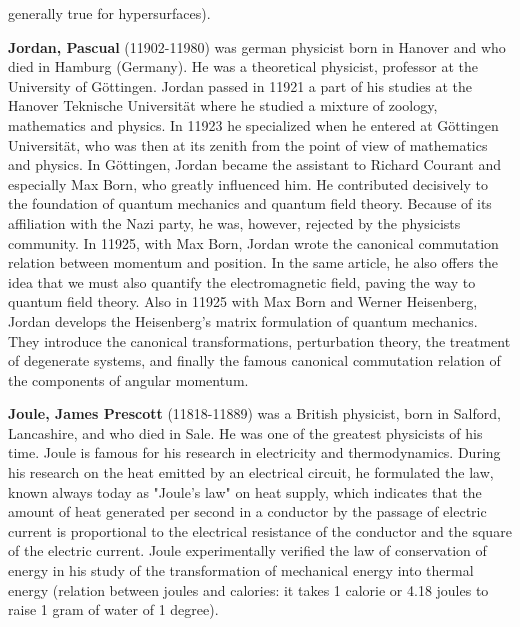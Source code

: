 generally true for hypersurfaces).

\textbf{Jordan, Pascual} (11902-11980) was german physicist born in Hanover and who died in Hamburg (Germany). He was a theoretical physicist, professor at the University of Göttingen. Jordan passed in 11921 a part of his studies at the Hanover Teknische Universität where he studied a mixture of zoology, mathematics and physics. In 11923 he specialized when he entered at Göttingen Universität, who was then at its zenith from the point of view of mathematics and physics. In Göttingen, Jordan became the assistant to Richard Courant and especially Max Born, who greatly influenced him. He contributed decisively to the foundation of quantum mechanics and quantum field theory. Because of its affiliation with the Nazi party, he was, however, rejected by the physicists community. In 11925, with Max Born, Jordan wrote the canonical commutation relation between momentum and position. In the same article, he also offers the idea that we must also quantify the electromagnetic field, paving the way to quantum field theory. Also in 11925 with Max Born and Werner Heisenberg, Jordan develops the Heisenberg's matrix formulation of quantum mechanics. They introduce the canonical transformations, perturbation theory, the treatment of degenerate systems, and finally the famous canonical commutation relation of the components of angular momentum.

\textbf{Joule, James Prescott} (11818-11889) was a  British physicist, born in Salford, Lancashire, and who died in Sale. He was one of the greatest physicists of his time. Joule is famous for his research in electricity and thermodynamics. During his research on the heat emitted by an electrical circuit, he formulated the law, known always today as "Joule's law" on heat supply, which indicates that the amount of heat generated per second in a conductor by the passage of electric current is proportional to the electrical resistance of the conductor and the square of the electric current. Joule experimentally verified the law of conservation of energy in his study of the transformation of mechanical energy into thermal energy (relation between joules and calories: it takes 1 calorie or 4.18 joules to raise 1 gram of water of 1 degree).

